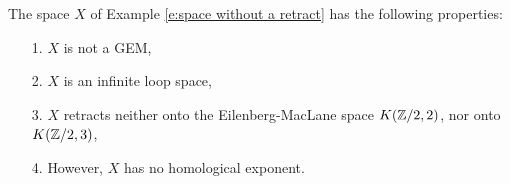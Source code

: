 The space $X$ of Example \ref{e:space without a retract} has the following properties:
\begin{itemize}
\item[1.]{$X$ is not a GEM,}
\item[2.]{$X$ is an infinite loop space,}
\item[3.]{$X$ retracts neither onto the Eilenberg-MacLane space $K(\mathbb{Z}/2,2)$, nor onto $K(\mathbb{Z}/2,3)$,}
\item[4.]{However, $X$ has no homological exponent.}
\end{itemize}
\endinput